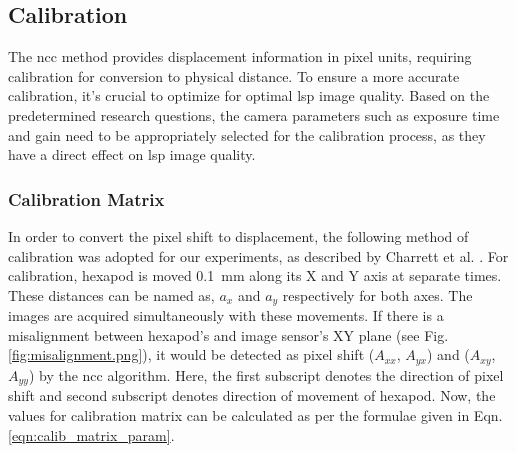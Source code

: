 
\subsection{Calibration}\label{section:calibration}
    The \gls{ncc} method provides displacement information in pixel units, requiring calibration for conversion to physical distance. To ensure a more accurate calibration, it's crucial to optimize for optimal \gls{lsp} image quality. Based on the predetermined research questions, the camera parameters such as exposure time and gain need to be appropriately selected for the calibration process, as they have a direct effect on \gls{lsp} image quality.

    \subsubsection*{Calibration Matrix}\label{subsection:calib_matrix}
        In order to convert the pixel shift to displacement, the following method of calibration was adopted for our experiments, as described by Charrett et al. \cite{charrett_2018}. For calibration, hexapod is moved \SI{0.1}{\milli\meter} along its X and Y axis at separate times. These distances can be named as, $a_x$ and $a_y$ respectively for both axes. The images are acquired simultaneously with these movements. If there is a misalignment between hexapod's and image sensor's XY plane (see Fig. \ref{fig:misalignment.png}), it would be detected as pixel shift ($A_{xx}$, $A_{yx}$) and ($A_{xy}$, $A_{yy}$) by the \gls{ncc} algorithm. Here, the first subscript denotes the direction of pixel shift and second subscript denotes direction of movement of hexapod. Now, the values for calibration matrix can be calculated as per the formulae given in Eqn. \ref{eqn:calib_matrix_param}.

